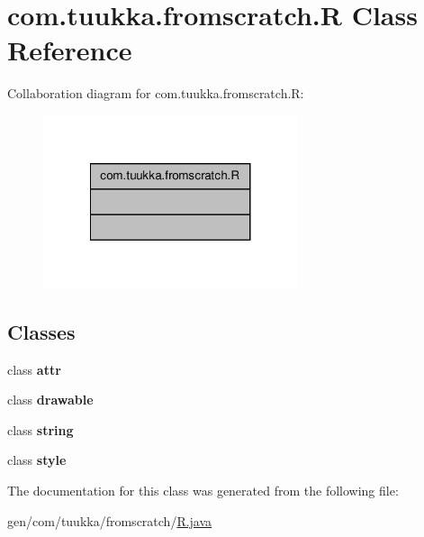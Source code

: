 \hypertarget{classcom_1_1tuukka_1_1fromscratch_1_1R}{\section{com.\-tuukka.\-fromscratch.\-R Class Reference}
\label{classcom_1_1tuukka_1_1fromscratch_1_1R}
}


Collaboration diagram for com.\-tuukka.\-fromscratch.\-R\-:
\nopagebreak
\begin{figure}[H]
\begin{center}
\leavevmode
\includegraphics[width=212pt]{classcom_1_1tuukka_1_1fromscratch_1_1R__coll__graph}
\end{center}
\end{figure}
\subsection*{Classes}
\begin{DoxyCompactItemize}
\item 
class {\bfseries attr}
\item 
class {\bfseries drawable}
\item 
class {\bfseries string}
\item 
class {\bfseries style}
\end{DoxyCompactItemize}


The documentation for this class was generated from the following file\-:\begin{DoxyCompactItemize}
\item 
gen/com/tuukka/fromscratch/\hyperlink{R_8java}{R.\-java}\end{DoxyCompactItemize}
